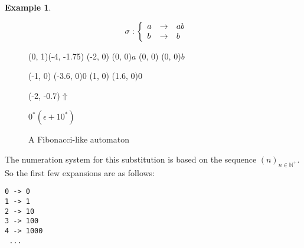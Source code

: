 \documentclass{article}
\newcommand{\spaces}{\begin{picture}(9,0)(0,0)\end{picture}}
\theoremstyle{definition}
\newtheorem{example}[theorem]{Example}
\begin{document}
\begin{example}
\begin{figure}[H]
\begin{eqnarray*}
\spaces
\sigma: \left\{ \begin{array}{lll}
a &\rightarrow& ab\\
b &\rightarrow& b
\end{array} \right.
\end{eqnarray*}
\begin{graph}(0, 1)(-4, -1.75)
  (-2, 0) (0, 0){$a$}
  (0, 0)  (0, 0){$b$}

  (-1, 0) \freetext(-3.6, 0){0}
   
  (1, 0) \freetext(1.6, 0){0}

  \freetext(-2, -0.7){$\Uparrow$}
\end{graph} $0^* (\epsilon + 10^*)$
\caption{A Fibonacci-like automaton}
\label{fig:fibonacci_brother}
\end{figure}

The numeration system for this substitution is based on the sequence 
$(n)_{n \in \mathbb{N}^+}$. So the first few expansions are as follows:
\begin{verbatim}
0 -> 0
1 -> 1
2 -> 10
3 -> 100
4 -> 1000
 ...
\end{verbatim}
\end{example}
\end{document}
